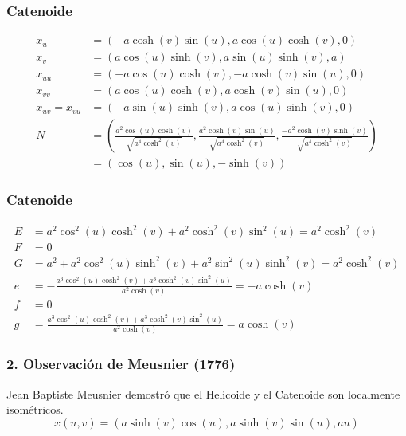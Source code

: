 \documentclass[10pt]{beamer}
\begin{document}
      \begin{frame}
        \frametitle{Catenoide}
\begin{align*}
x_u & = (-a \cosh(v) \sin(u), a \cos(u) \cosh(v), 0) \\
x_v & = (a \cos(u) \sinh(v), a \sin(u) \sinh(v), a) \\
x_{uu} & = (-a \cos(u) \cosh(v), -a \cosh(v) \sin(u), 0) \\
x_{vv} & = (a \cos(u) \cosh(v), a \cosh(v) \sin(u), 0) \\
x_{uv} = x_{vu} & = (-a \sin(u) \sinh(v), a \cos(u) \sinh(v), 0) \\
N & = \left(\frac{a^2 \cos(u) \cosh(v)}{\sqrt{a^4 \cosh^2(v)}}, \frac{a^2 \cosh(v) \sin(u)}{\sqrt{a^4 \cosh^2(v)}}, \frac{-a^2 \cosh(v) \sinh(v)}{\sqrt{a^4 \cosh^2(v)}}\right)\\
&= (\cos(u), \sin(u), -\sinh(v))
\end{align*}

        \end{frame}
        \begin{frame}
          \frametitle{Catenoide}
  \begin{align*}
  E & = a^2 \cos^2(u) \cosh^2(v) + a^2 \cosh^2(v) \sin^2(u) = a^2 \cosh^2(v) \\
  F & = 0 \\
  G & = a^2 + a^2 \cos^2(u) \sinh^2(v) + a^2 \sin^2(u) \sinh^2(v) = a^2 \cosh^2(v)\\
  e & = -\frac{a^3 \cos^2(u) \cosh^2(v) + a^3 \cosh^2(v) \sin^2(u)}{a^2 \cosh(v)}=-a \cosh(v) \\
  f & = 0 \\
  g & = \frac{a^3 \cos^2(u) \cosh^2(v) + a^3 \cosh^2(v) \sin^2(u)}{a^2 \cosh(v)} = a \cosh(v)
  \end{align*}
  
          \end{frame}

      \begin{frame}
        \frametitle{2. Observación de Meusnier (1776)}
        Jean Baptiste Meusnier demostró que el Helicoide y el Catenoide son localmente isométricos. 
        \[
        x(u, v) = (a\sinh(v)\cos(u), a\sinh(v)\sin(u), au)
        \]
        \end{frame}
\end{document}
